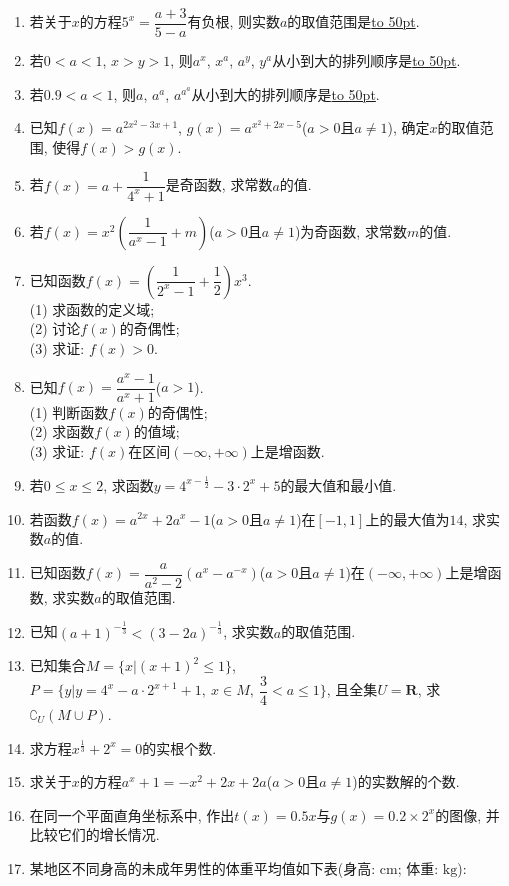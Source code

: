 \documentclass[10pt,a4paper]{article}
\newcommand{\blank}[1]{\underline{\hbox to #1pt{}}}
\begin{document}
\begin{enumerate}[1.]
\item 若关于$x$的方程$5^x=\dfrac{a+3}{5-a}$有负根, 则实数$a$的取值范围是\blank{50}.
\item 若$0<a<1$, $x>y>1$, 则$a^x$, $x^a$, $a^y$, $y^a$从小到大的排列顺序是\blank{50}.
\item 若$0.9<a<1$, 则$a$, $a^a$, $a^{a^a}$从小到大的排列顺序是\blank{50}.
\item 已知$f(x)=a^{2x^2-3x+1}$, $g(x)=a^{x^2+2x-5}$($a>0$且$a\ne 1$), 确定$x$的取值范围, 使得$f(x)>g(x)$.
\item 若$f(x)=a+\dfrac 1{4^x+1}$是奇函数, 求常数$a$的值.
\item 若$f(x)=x^2(\dfrac 1{a^x-1}+m)$($a>0$且$a\ne 1$)为奇函数, 求常数$m$的值.
\item 已知函数$f(x)=(\dfrac 1{2^x-1}+\dfrac 12)x^3$.\\
(1) 求函数的定义域;\\
(2) 讨论$f(x)$的奇偶性;\\
(3) 求证: $f(x)>0$.
\item 已知$f(x)=\dfrac{a^x-1}{a^x+1}$($a>1$).\\
(1) 判断函数$f(x)$的奇偶性;\\
(2) 求函数$f(x)$的值域;\\
(3) 求证: $f(x)$在区间$(-\infty ,+\infty)$上是增函数.
\item 若$0\le x\le 2$, 求函数$y=4^{x-\frac 12}-3\cdot 2^x+5$的最大值和最小值.
\item 若函数$f(x)=a^{2x}+2a^x-1$($a>0$且$a\ne 1$)在$[-1, 1]$上的最大值为$14$, 求实数$a$的值.
\item 已知函数$f(x)=\dfrac a{a^2-2}(a^x-a^{-x})$($a>0$且$a\ne 1$)在$(-\infty ,+\infty)$上是增函数, 求实数$a$的取值范围.
\item 已知$(a+1)^{-\frac 13}<(3-2a)^{-\frac 13}$, 求实数$a$的取值范围.
\item 已知集合$M=\{x|(x+1)^2\le 1\}$, $P=\{y|y=4^x-a\cdot 2^{x+1}+1,\ x\in M,\ \dfrac 34<a\le 1\}$, 且全集$U=\mathbf{R}$, 求$\complement _U(M\cup P)$.
\item 求方程$x^{\frac 13}+2^x=0$的实根个数.
\item 求关于$x$的方程$a^x+1=-x^2+2x+2a$($a>0$且$a\ne 1$)的实数解的个数.
\item 在同一个平面直角坐标系中, 作出$t(x)=0.5x$与$g(x)=0.2\times 2^x$的图像, 并比较它们的增长情况.
\item 某地区不同身高的未成年男性的体重平均值如下表(身高: $\text{cm}$; 体重: $\text{kg}$):
\begin{center}
    \begin{tabular}{|c|c|c|c|c|c|c|}

\end{tabular}
\end{center}
\end{enumerate}
\end{document}

